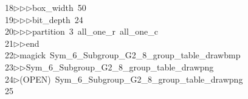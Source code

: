 \begin{tabbing}
18\>$\triangleright$\>$\triangleright$\>$\triangleright$\>box\_width\ 50\ \\[0pt]
19\>$\triangleright$\>$\triangleright$\>$\triangleright$\>bit\_depth\ 24\ \\[0pt]
20\>$\triangleright$\>$\triangleright$\>$\triangleright$\>partition\ 3\ all\_one\_r\ all\_one\_c\ \\[0pt]
21\>$\triangleright$\>$\triangleright$\>end\\[0pt]
22\>$\triangleright$\>magick\ Sym\_6\_Subgroup\_G2\_8\_group\_table\_drawbmp\ \\[0pt]
23\>$\triangleright$\>$\triangleright$\>Sym\_6\_Subgroup\_G2\_8\_group\_table\_drawpng\\[0pt]
24\>$\triangleright$\>(OPEN)\ Sym\_6\_Subgroup\_G2\_8\_group\_table\_drawpng\\[0pt]
25\>\end{tabbing}
